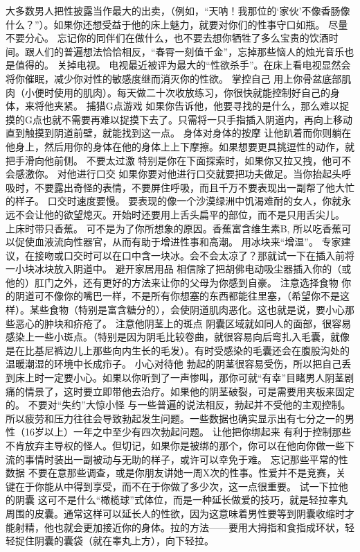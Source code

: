 \documentclass[12pt,UTF8]{ctexbook}
\begin{document}
大多数男人把性披露当作最大的出卖，（例如，“天呐！我那位的‘家伙’不像香肠像什么？”）。如果你还想受益于他的床上魅力，就要对你们的性事守口如瓶。
尽量不要分心。
忘记你的同伴们在做什么，也不要去想你牺牲了多么宝贵的饮酒时间。跟人们的普遍想法恰恰相反，“春霄一刻值千金”，忘掉那些恼人的烛光音乐也是值得的。
关掉电视。
电视最近被评为最大的“性欲杀手”。在床上看电视显然会将你催眠，减少你对性的敏感度继而消灭你的性欲。
掌控自己
用上你骨盆底部肌肉（小便时使用的肌肉）。每天做二十次收放练习，你很快就能控制好自己的身体，来将他夹紧。
捕猎G点游戏
如果你告诉他，他要寻找的是什么，那么难以捉摸的G点也就不需要再难以捉摸下去了。只需将一只手指插入阴道内，再向上移动直到触摸到阴道前壁，就能找到这一点。
身体对身体的按摩
让他趴着而你则躺在他身上，然后用你的身体在他的身体上上下摩擦。如果想要更具挑逗性的动作，就把手滑向他前侧。
不要太过激
特别是你在下面探索时，如果你又拉又拽，他可不会感激你。
对他进行口交
如果你要对他进行口交就要把功夫做足。当你抬起头呼吸时，不要露出奇怪的表情，不要屏住呼吸，而且千万不要表现出一副帮了他大忙的样子。
口交时速度要慢。
要表现的像一个沙漠绿洲中饥渴难耐的女人，你就永远不会让他的欲望熄灭。开始时还要用上舌头扁平的部位，而不是只用舌尖儿。
上床时带只香蕉。
可不是为了你所想象的原因。香蕉富含维生素B, 所以吃香蕉可以促使血液流向性器官，从而有助于增进性事和高潮。
用冰块来“增温”。
专家建议，在接吻或口交时可以在口中含一块冰。会不会太凉了？那就试一下在插入前将一小块冰块放入阴道中。
避开家居用品
相信除了把胡佛电动吸尘器插入你的（或他的）肛门之外，还有更好的方法来让你的父母为你感到自豪。
注意选择食物
你的阴道可不像你的嘴巴一样，不是所有你想塞的东西都能往里塞，（希望你不是这样）。某些食物（特别是富含糖分的），会使阴道肌肉恶化。这也就是说，要小心那些恶心的肿块和疥疮了。
注意他阴茎上的斑点
阴囊区域就如同人的面部，很容易感染上一些小斑点。（特别是因为阴毛比较卷曲，就很容易向后弯扎入毛囊，就像是在比基尼裤边儿上那些向内生长的毛发）。有时受感染的毛囊还会在腹股沟处的温暖潮湿的环境中长成疖子。
小心对待他
勃起的阴茎很容易受伤，所以把自己丢到床上时一定要小心。如果以你听到了一声惨叫，那你可就“有幸”目睹男人阴茎剧痛的情景了，这时要立即带他去治疗。如果他的阴茎破裂，可是需要用夹板来固定的。
不要对“失约”大惊小怪
与一些普遍的说法相反，勃起并不受他的主观控制。所以疲劳和压力往往会导致勃起发生问题。一些数据也确实显示出有七分之一的男性（16岁以上）一年之中至少有四次勃起问题。
让他把你绑起来
有利于控制那些不肯放弃主导权的怪人。但切记，如果你是被绑的那个，你可以在他向你做一些下流的事情时装出一副被动与无助的样子，或许可以幸免于难。
忘记那些平常的性数据
不要在意那些调查，或是你朋友讲她一周X次的性事。性爱并不是竞赛，关键在于你能从中得到享受，而不在于你做了多少次，这一点很重要。
试一下拉他的阴囊
这可不是什么“橄榄球”式体位，而是一种延长做爱的技巧，就是轻拉睾丸周围的皮囊。通常这样可以延长人的性欲，因为这意味着男性要等到阴囊收缩时才能射精，他也就会更加接近你的身体。拉的方法——要用大拇指和食指成环状，轻轻捉住阴囊的囊袋（就在睾丸上方），向下轻拉。
\end{document}
